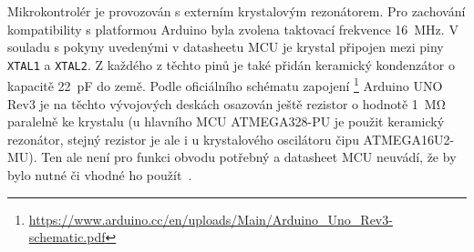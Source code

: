 Mikrokontrolér je provozován s externím krystalovým rezonátorem. Pro zachování
kompatibility s platformou Arduino byla zvolena taktovací frekvence
\SI{16}{\mega\hertz}. V souladu s pokyny uvedenými v datasheetu MCU je krystal
připojen mezi piny \texttt{XTAL1} a \texttt{XTAL2}. Z každého z těchto pinů je
také přidán keramický kondenzátor o kapacitě \SI{22}{\pico\farad} do země.
Podle oficiálního schématu zapojení
\footnote{\url{https://www.arduino.cc/en/uploads/Main/Arduino_Uno_Rev3-schematic.pdf}}
Arduino UNO Rev3 je na těchto vývojových deskách osazován ještě rezistor
o hodnotě \SI{1}{\mega\ohm} paralelně ke krystalu (u hlavního MCU ATMEGA328-PU
je použit keramický rezonátor, stejný rezistor je ale i u krystalového
oscilátoru čipu ATMEGA16U2-MU). Ten ale není pro funkci obvodu potřebný
a datasheet MCU neuvádí, že by bylo nutné či vhodné ho
použít~\cite{dshATmega328}.
